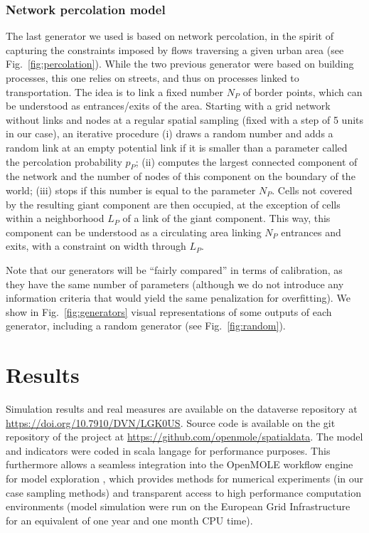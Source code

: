 \documentclass[letterpaper]{article}
\begin{document}
\subsubsection{Network percolation model}

The last generator we used is based on network percolation, in the spirit of capturing the constraints imposed by flows traversing a given urban area (see Fig.~\ref{fig:percolation}). While the two previous generator were based on building processes, this one relies on streets, and thus on processes linked to transportation. The idea is to link a fixed number $N_P$ of border points, which can be understood as entrances/exits of the area. Starting with a grid network without links and nodes at a regular spatial sampling (fixed with a step of 5 units in our case), an iterative procedure (i) draws a random number and adds a random link at an empty potential link if it is smaller than a parameter called the percolation probability $p_P$; (ii) computes the largest connected component of the network and the number of nodes of this component on the boundary of the world; (iii) stops if this number is equal to the parameter $N_P$. Cells not covered by the resulting giant component are then occupied, at the exception of cells within a neighborhood $L_P$ of a link of the giant component. This way, this component can be understood as a circulating area linking $N_P$ entrances and exits, with a constraint on width through $L_P$.


Note that our generators will be ``fairly compared'' in terms of calibration, as they have the same number of parameters (although we do not introduce any information criteria that would yield the same penalization for overfitting).
We show in Fig.~\ref{fig:generators} visual representations of some outputs of each generator, including a random generator (see Fig.~\ref{fig:random}).


\section{Results} \label{sec:results}

Simulation results and real measures are available on the dataverse repository at \url{https://doi.org/10.7910/DVN/LGK0US}. Source code is available on the git repository of the project at \url{https://github.com/openmole/spatialdata}.
The model and indicators were coded in scala langage for performance purposes. This furthermore allows a seamless integration into the OpenMOLE workflow engine for model exploration \citep{reuillon2013openmole}, which provides methods for numerical experiments (in our case sampling methods) and transparent access to high performance computation environments (model simulation were run on the European Grid Infrastructure for an equivalent of one year and one month CPU time).
\end{document}
